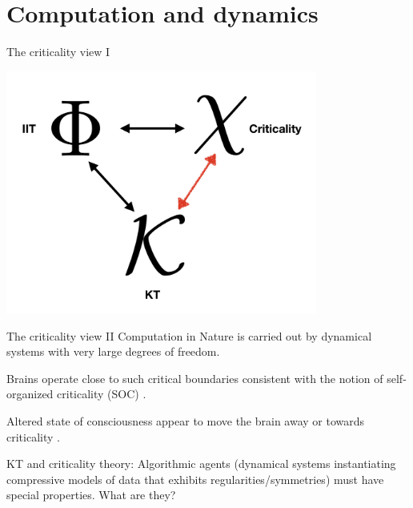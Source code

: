 \section{Computation and dynamics}



\begin{frame}[label=ladila]{The criticality view I}
 \begin{center}
  \includegraphics[height=8cm]{img/KUF.png}
  \end{center}
\end{frame}


\begin{frame}[label=ladila]{The criticality view II}
 Computation  in Nature is carried out by dynamical systems with very large degrees of freedom.  \vfill
 
  Brains operate close to such critical boundaries consistent with the notion of self-organized criticality (SOC) \citep{Bak1988,Chialvo:2004aa,Cocchi2017,Carhart2018,Deco2021}. \vfill
  
  Altered state of consciousness appear to move the brain away or towards criticality \citep{CarhartHarris2019,Ruffini:2022ac}. %
  \vfill
  
  KT and criticality theory:  Algorithmic agents (dynamical systems instantiating  compressive models of  data that exhibits regularities/symmetries)  must have special properties.  What are they?\vfill
 
  \end{frame}
  
